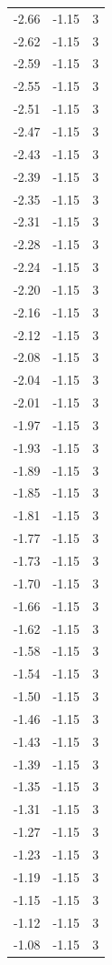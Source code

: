\begin{longtable}{lrr}
  -2.66 & -1.15 & 3 \\
  -2.62 & -1.15 & 3 \\
  -2.59 & -1.15 & 3 \\
  -2.55 & -1.15 & 3 \\
  -2.51 & -1.15 & 3 \\
  -2.47 & -1.15 & 3 \\
  -2.43 & -1.15 & 3 \\
  -2.39 & -1.15 & 3 \\
  -2.35 & -1.15 & 3 \\
  -2.31 & -1.15 & 3 \\
  -2.28 & -1.15 & 3 \\
  -2.24 & -1.15 & 3 \\
  -2.20 & -1.15 & 3 \\
  -2.16 & -1.15 & 3 \\
  -2.12 & -1.15 & 3 \\
  -2.08 & -1.15 & 3 \\
  -2.04 & -1.15 & 3 \\
  -2.01 & -1.15 & 3 \\
  -1.97 & -1.15 & 3 \\
  -1.93 & -1.15 & 3 \\
  -1.89 & -1.15 & 3 \\
  -1.85 & -1.15 & 3 \\
  -1.81 & -1.15 & 3 \\
  -1.77 & -1.15 & 3 \\
  -1.73 & -1.15 & 3 \\
  -1.70 & -1.15 & 3 \\
  -1.66 & -1.15 & 3 \\
  -1.62 & -1.15 & 3 \\
  -1.58 & -1.15 & 3 \\
  -1.54 & -1.15 & 3 \\
  -1.50 & -1.15 & 3 \\
  -1.46 & -1.15 & 3 \\
  -1.43 & -1.15 & 3 \\
  -1.39 & -1.15 & 3 \\
  -1.35 & -1.15 & 3 \\
  -1.31 & -1.15 & 3 \\
  -1.27 & -1.15 & 3 \\
  -1.23 & -1.15 & 3 \\
  -1.19 & -1.15 & 3 \\
  -1.15 & -1.15 & 3 \\
  -1.12 & -1.15 & 3 \\
  -1.08 & -1.15 & 3 \\

\end{longtable}
